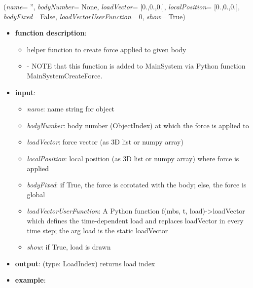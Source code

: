 %
\begin{flushleft}
\label{sec:mainsystemextensions:CreateForce}
({\it name}= '', {\it bodyNumber}= None, {\it loadVector}= [0.,0.,0.], {\it localPosition}= [0.,0.,0.], {\it bodyFixed}= False, {\it loadVectorUserFunction}= 0, {\it show}= True)
\end{flushleft}
\setlength{\itemindent}{0.7cm}
\begin{itemize}[leftmargin=0.7cm]
\item[--]
{\bf function description}: \vspace{-6pt}
\begin{itemize}[leftmargin=1.2cm]
\setlength{\itemindent}{-0.7cm}
\item[]helper function to create force applied to given body
\item[]- NOTE that this function is added to MainSystem via Python function MainSystemCreateForce.
\end{itemize}
\item[--]
{\bf input}: \vspace{-6pt}
\begin{itemize}[leftmargin=1.2cm]
\setlength{\itemindent}{-0.7cm}
\item[]{\it name}: name string for object
\item[]{\it bodyNumber}: body number (ObjectIndex) at which the force is applied to
\item[]{\it loadVector}: force vector (as 3D list or numpy array)
\item[]{\it localPosition}: local position (as 3D list or numpy array) where force is applied
\item[]{\it bodyFixed}: if True, the force is corotated with the body; else, the force is global
\item[]{\it loadVectorUserFunction}: A Python function f(mbs, t, load)->loadVector which defines the time-dependent load and replaces loadVector in every time step; the arg load is the static loadVector
\item[]{\it show}: if True, load is drawn
\end{itemize}
\item[--]
{\bf output}: (type: LoadIndex) returns load index
\item[--]
{\bf example}: \vspace{-12pt}\ei\begin{lstlisting}[language=Python, xleftmargin=36pt]

\end{lstlisting}
\end{itemize}
